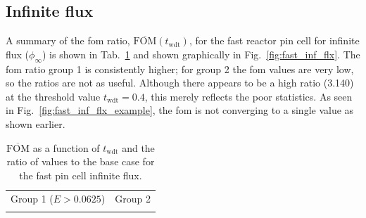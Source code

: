 \subsection{Infinite flux}
\label{sec:fast_inf_flx}
A summary of the \gls{fom} ratio,
$\overline{\mathrm{FOM}}(t_{\mathrm{wdt}})$, for the fast reactor pin
cell for infinite flux ($\phi_{\infty}$) is shown in Tab.~\ref{tab:fast_inf_flx} and
shown graphically in Fig.~\ref{fig:fast_inf_flx}. The \gls{fom} ratio
group 1 is consistently higher; for group 2 the \gls{fom} values are
very low, so the ratios are not as useful. Although there appears to
be a high ratio (3.140) at the threshold value $t_{\mathrm{wdt}}
=0.4$, this merely reflects the poor statistics. As seen in
Fig.~\ref{fig:fast_inf_flx_example}, the \gls{fom} is not converging
to a single value as shown earlier.
\begin{table}[hbtp]
  \centering
  \caption[$\overline{\mathrm{FOM}}$ and ratio for
    the fast pin cell infinite flux.]{$\overline{\mathrm{FOM}}$ as a function of
    $t_{\mathrm{wdt}}$ and the ratio of values to the base case for
    the fast pin cell infinite flux.}
  \begin{tabular}{cc} Group 1 ($E > 0.0625$) & Group 2 \\
    
 &
   
  \end{tabular}
\label{tab:fast_inf_flx}
\end{table}
